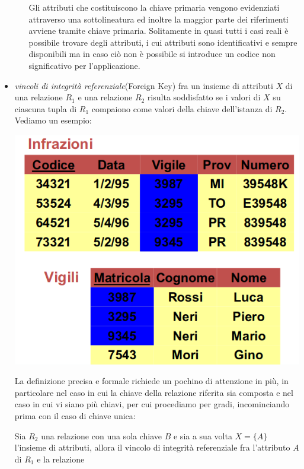 \documentclass[a4paper,12pt, oneside]{book}
\begin{document}
\begin{itemize}
\begin{enumerate}
                Gli attributi che costituiscono la chiave primaria
                vengono evidenziati attraverso una sottolineatura ed inoltre la maggior parte dei riferimenti
                avviene tramite chiave primaria.\newline
                Solitamente in quasi tutti i casi reali è possibile trovare degli attributi, i cui attributi
                sono identificativi e sempre disponibili ma in caso ciò non è possibile si introduce un codice
                non significativo per l'applicazione.
        \end{enumerate}
    \item \emph{vincoli di integrità referenziale}(Foreign Key) fra un insieme di attributi $X$ di una
        relazione $R_1$ e una relazione $R_2$ risulta soddisfatto se i valori di $X$ su ciascuna tupla di
        $R_1$ compaiono come valori della chiave dell'istanza di $R_2$. Vediamo un esempio:
	\begin{center}
		\includegraphics[scale=0.7]{img/infref.png}
	\end{center}
        La definizione precisa e formale richiede un pochino di attenzione in più, in particolare nel caso in
        cui la chiave della relazione riferita sia composta e nel caso in cui vi siano più chiavi, per cui
        procediamo per gradi, incominciando prima con il caso di chiave unica:
        \begin{definizione}
            Sia $R_2$ una relazione con una sola chiave $B$ e sia a sua volta $X = \{A\}$ l'insieme di
            attributi, allora il vincolo di integrità referenziale fra l'attributo $A$ di $R_1$ e la relazione

\end{definizione}
\end{itemize}
\end{document}
